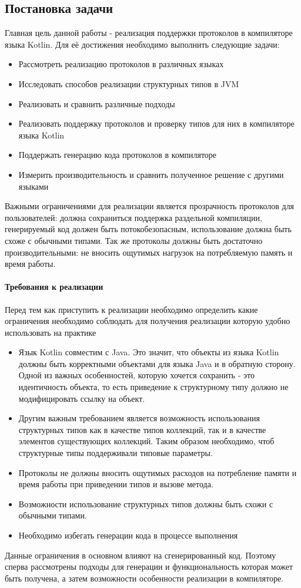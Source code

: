 \subsection{Постановка задачи}
Главная цель данной работы - реализация поддержки протоколов в компиляторе языка Kotlin. Для её достижения необходимо выполнить следующие задачи:
\begin{itemize}
    \item Рассмотреть реализацию протоколов в различных языках
    \item Исследовать способов реализации структурных типов в JVM
    \item Реализовать и сравнить различные подходы
    \item Реализовать поддержку протоколов и проверку типов для них в компиляторе языка Kotlin
    \item Поддержать генерацию кода протоколов в компиляторе
    \item Измерить производительность и сравнить полученное решение с другими языками
\end{itemize}

Важными ограничениями для реализации является прозрачность протоколов для пользователей: должна сохраниться поддержка раздельной компиляции, генерируемый код должен быть потокобезопасным, использование должна быть схоже с обычными типами. Так же протоколы должны быть достаточно производительными: не вносить ощутимых нагрузок на потребляемую память и время работы.

\paragraph{Требования к реализации}
Перед тем как приступить к реализации необходимо определить какие ограничения необходимо соблюдать для получения реализации которую удобно использовать на практике

\begin{itemize}
\item Язык Kotlin совместим с Java. Это значит, что объекты из языка Kotlin должны быть корректными объектами для языка Java и в обратную сторону. Одной из важных особенностей, которую хочется сохранить - это идентичность объекта, то есть приведение к структурному типу должно не модифицировать ссылку на объект.
\item Другим важным требованием является возможность использования структурных типов как в качестве типов коллекций, так и в качестве элементов существующих коллекций. Таким образом необходимо, чтоб структурные типы поддерживали типовые параметры.
\item Протоколы не должны вносить ощутимых расходов на потребление памяти и время работы при приведении типов и вызове метода.
\item Возможности использование структурных типов должны быть схожи с обычными типами.
\item Необходимо избегать генерации кода в процессе выполнения
\end{itemize}

Данные ограничения в основном влияют на сгенерированный код. Поэтому сперва рассмотрены подходы для генерации и функциональность которая может быть получена, а затем возможности особенности реализации в компиляторе.
